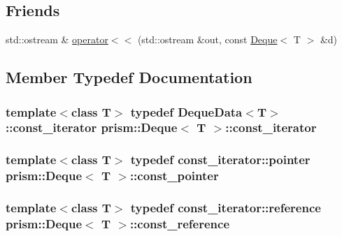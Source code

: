 \subsection*{Friends}
\begin{DoxyCompactItemize}
\item 
std\+::ostream \& \hyperlink{classprism_1_1_deque_ad61d2d7b39e3a685744108225e82f123}{operator$<$$<$} (std\+::ostream \&out, const \hyperlink{classprism_1_1_deque}{Deque}$<$ T $>$ \&d)
\end{DoxyCompactItemize}


\subsection{Member Typedef Documentation}
\subsubsection[{\texorpdfstring{const\+\_\+iterator}{const_iterator}}]{\setlength{\rightskip}{0pt plus 5cm}template$<$class T$>$ typedef Deque\+Data$<$T$>$\+::{\bf const\+\_\+iterator} {\bf prism\+::\+Deque}$<$ T $>$\+::{\bf const\+\_\+iterator}}\hypertarget{classprism_1_1_deque_afc2f71fd5b01e963e093f64cc4da94ec}{}\label{classprism_1_1_deque_afc2f71fd5b01e963e093f64cc4da94ec}
\subsubsection[{\texorpdfstring{const\+\_\+pointer}{const_pointer}}]{\setlength{\rightskip}{0pt plus 5cm}template$<$class T$>$ typedef const\+\_\+iterator\+::pointer {\bf prism\+::\+Deque}$<$ T $>$\+::{\bf const\+\_\+pointer}}\hypertarget{classprism_1_1_deque_a4c43189271514578fda69c968b1d4e3c}{}\label{classprism_1_1_deque_a4c43189271514578fda69c968b1d4e3c}
\subsubsection[{\texorpdfstring{const\+\_\+reference}{const_reference}}]{\setlength{\rightskip}{0pt plus 5cm}template$<$class T$>$ typedef const\+\_\+iterator\+::reference {\bf prism\+::\+Deque}$<$ T $>$\+::{\bf const\+\_\+reference}}\hypertarget{classprism_1_1_deque_a8fcabfe6976606b91b4abef0e0353584}{}\label{classprism_1_1_deque_a8fcabfe6976606b91b4abef0e0353584}
